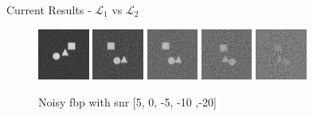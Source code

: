 \documentclass[aspectratio=169]{beamer}
\begin{document}
\begin{frame}{Current Results - $\mathcal{L}_1$ vs $\mathcal{L}_2$}
    
    \begin{figure}
        \includegraphics[width=0.15\textwidth]{noisy_fbp_5}
        \includegraphics[width=0.15\textwidth]{noisy_fbp_0}
        \includegraphics[width=0.15\textwidth]{noisy_fbp_n5}
        \includegraphics[width=0.15\textwidth]{noisy_fbp_n10}
        \includegraphics[width=0.15\textwidth]{noisy_fbp_n20}
        \caption{Noisy fbp with snr [5, 0, -5, -10 ,-20]}
    \end{figure}


\end{frame}
\end{document}
